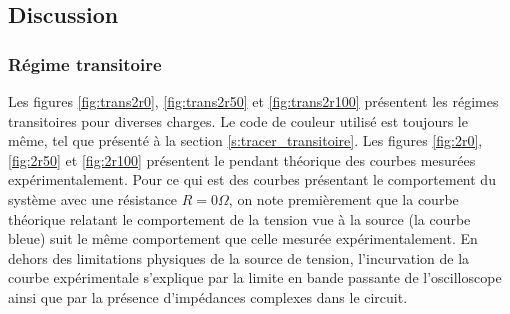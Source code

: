 \begin{figure}[htb]
	\centering
	\mbox{}
\end{figure}
\clearpage
\newpage

\subsection{Discussion}

\subsubsection{Régime transitoire}
Les figures \ref{fig:trans2r0}, \ref{fig:trans2r50} et \ref{fig:trans2r100} présentent les régimes transitoires pour diverses charges. Le code de couleur utilisé est toujours le même, tel que présenté à la section \ref{s:tracer_transitoire}. Les figures \ref{fig:2r0}, \ref{fig:2r50} et \ref{fig:2r100} présentent le pendant théorique des courbes mesurées expérimentalement. Pour ce qui est des courbes présentant le comportement du système avec une résistance $R=0\Omega$, on note premièrement que la courbe théorique relatant le comportement de la tension vue à la source (la courbe bleue) suit le même comportement que celle mesurée expérimentalement. En dehors des limitations physiques de la source de tension, l'incurvation de la courbe expérimentale s'explique par la limite en bande passante de l'oscilloscope ainsi que par la présence d'impédances complexes dans le circuit. 

